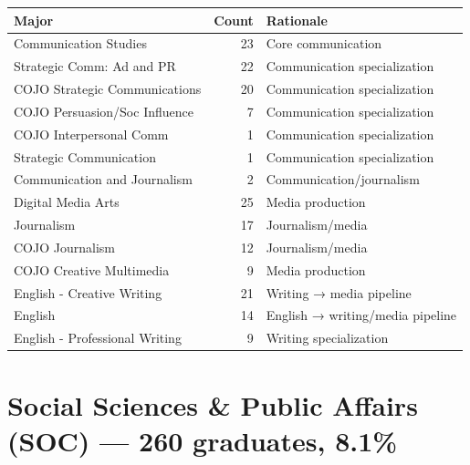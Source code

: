 \documentclass[
  11pt,
  letterpaper,
]{report}
\begin{document}
\begin{longtable}[]{@{}lrl@{}}
\toprule\noalign{}
Major & Count & Rationale \\
\midrule\noalign{}
\endhead
\bottomrule\noalign{}
\endlastfoot
Communication Studies & 23 & Core communication \\
Strategic Comm: Ad and PR & 22 & Communication specialization \\
COJO Strategic Communications & 20 & Communication specialization \\
COJO Persuasion/Soc Influence & 7 & Communication specialization \\
COJO Interpersonal Comm & 1 & Communication specialization \\
Strategic Communication & 1 & Communication specialization \\
Communication and Journalism & 2 & Communication/journalism \\
Digital Media Arts & 25 & Media production \\
Journalism & 17 & Journalism/media \\
COJO Journalism & 12 & Journalism/media \\
COJO Creative Multimedia & 9 & Media production \\
English - Creative Writing & 21 & Writing → media pipeline \\
English & 14 & English → writing/media pipeline \\
English - Professional Writing & 9 & Writing specialization \\
\end{longtable}

\section{Social Sciences \& Public Affairs (SOC) --- 260 graduates,
8.1\%}\label{social-sciences-public-affairs-soc-260-graduates-8.1}
\end{document}
